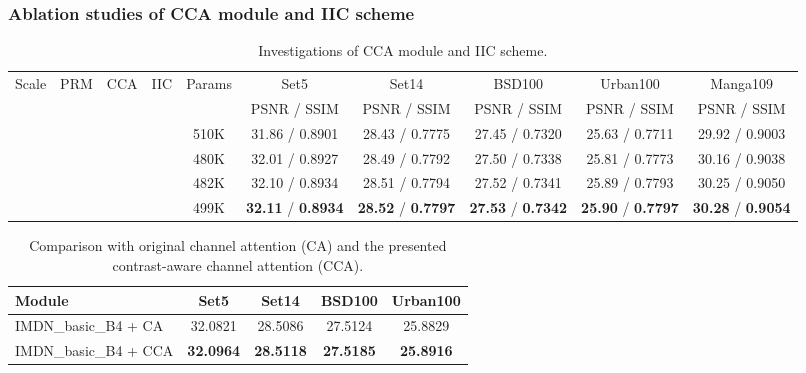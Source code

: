 \documentclass[sigconf]{acmart}
\begin{document}
\subsubsection{Ablation studies of CCA module and IIC scheme}
\begin{table*}[htpb]
	\centering
	\caption{Investigations of CCA module and IIC scheme.}
	\label{tab:cca-iic}
	\begin{tabular}{|c|c|c|c|c|c|c|c|c|c|}
		\hline
		\multirow{2}{*}{Scale} & \multirow{2}{*}{PRM} & \multirow{2}{*}{CCA} & \multirow{2}{*}{IIC} & \multirow{2}{*}{Params} & Set5 & Set14 & BSD100 & Urban100 & Manga109 \\
		\cline{6-10}
		& & & & & PSNR / SSIM & PSNR / SSIM & PSNR / SSIM & PSNR / SSIM & PSNR / SSIM \\
		\hline
		\hline
		\multirow{4}{*}{} & \XSolid & \XSolid & \XSolid & 510K & 31.86 / 0.8901 & 28.43 / 0.7775 &  27.45 / 0.7320 & 25.63 / 0.7711 & 29.92 / 0.9003 \\
		
		& \Checkmark & \XSolid & \XSolid & 480K & 32.01 / 0.8927 & 28.49 / 0.7792 & 27.50 / 0.7338 & 25.81 / 0.7773 & 30.16 / 0.9038 \\
		& \Checkmark& \Checkmark & \XSolid & 482K & 32.10 / 0.8934 & 28.51 / 0.7794 & 27.52 / 0.7341 & 25.89 / 0.7793 & 30.25 / 0.9050 \\
		& \Checkmark & \Checkmark & \Checkmark & 499K & \textbf{32.11} / \textbf{0.8934} & \textbf{28.52} / \textbf{0.7797} & \textbf{27.53} / \textbf{0.7342} & \textbf{25.90} / \textbf{0.7797} & \textbf{30.28} / \textbf{0.9054} \\
		\hline
	\end{tabular}
\end{table*}

\begin{table}[htpb]
	\small
	\centering
	\caption{Comparison with original channel attention (CA) and the presented contrast-aware channel attention (CCA).}
	\begin{tabular}{|l|c|c|c|c|}
		\hline
		Module & Set5 & Set14 & BSD100 & Urban100\\
		\hline
		\hline
		IMDN\_basic\_B4 + CA & 32.0821 & 28.5086 & 27.5124 & 25.8829 \\
		IMDN\_basic\_B4 + CCA & \textbf{32.0964} & \textbf{28.5118} & \textbf{27.5185} & \textbf{25.8916} \\
		\hline
	\end{tabular}
	\label{tab:ca-and-cca}
\end{table}
\end{document}
